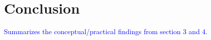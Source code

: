 \documentclass{article}
\newcommand{\ziang}{\textcolor{blue}}
\begin{document}
\section{Conclusion}\label{conclusion}
\ziang{Summarizes the conceptual/practical findings from section 3 and 4.}

\newpage


\end{document}
